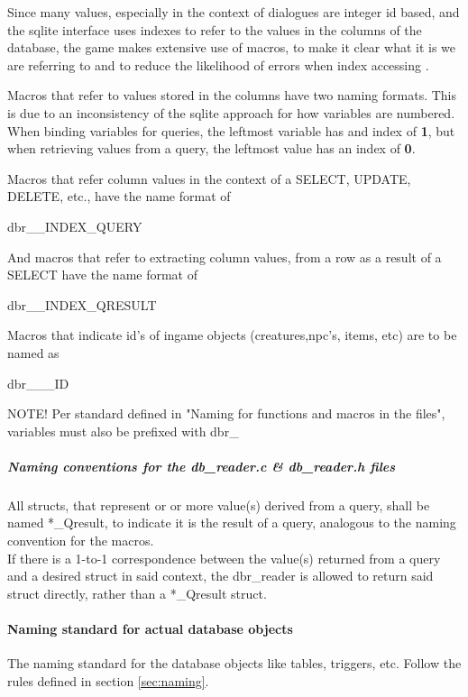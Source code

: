 \documentclass{report}
\begin{document}
Since many values, especially in the context of dialogues are integer id based, and the sqlite interface uses indexes to refer to the values in the columns of the database, the game makes extensive use of macros, to make it clear what it is we are referring to and to reduce the likelihood of errors when index accessing .\newline

Macros that refer to values stored in the columns have two naming formats. This is due to an inconsistency of the sqlite approach for how variables are numbered. When binding variables for queries, the leftmost variable has and index of \textbf{1}, but when retrieving values from a query, the leftmost value has an index of \textbf{0}. \newline

Macros that refer column values in the context of a SELECT, UPDATE, DELETE, etc., have the name format of 

\begin{center}
dbr\_<table name>\_<column name>INDEX\_QUERY
\end{center}

And macros that refer to extracting column values, from a row as a result of a SELECT have the name format of

\begin{center}
dbr\_<table name>\_<column name>INDEX\_QRESULT
\end{center}

Macros that indicate id's of ingame objects (creatures,npc's, items, etc) are to be named as 

\begin{center}
dbr\_<table name>\_<OBJECT NAME>\_ID
\end{center}

NOTE! Per standard defined in "Naming for functions and macros in the files", variables must also be prefixed with dbr\_
\subparagraph*{Naming conventions for the db\_reader.c \& db\_reader.h files}
All structs, that represent or or more value(s) derived from a query, shall be named *\_Qresult, to indicate it is the result of a query, analogous to the naming convention for the macros. \\

If there is a 1-to-1 correspondence between the value(s) returned from a query and a desired struct in said context, the dbr\_reader is allowed to return said struct directly, rather than a *\_Qresult struct.

\paragraph*{Naming standard for actual database objects}
The naming standard for the database objects like tables, triggers, etc. Follow the rules defined in section \ref{sec:naming}.
\end{document}
